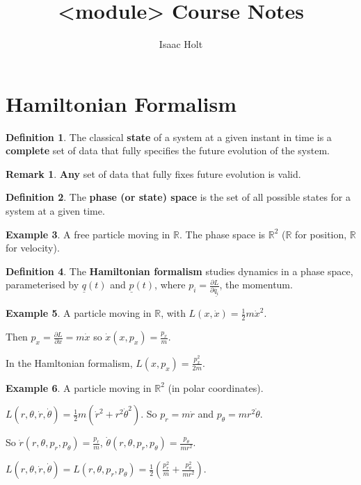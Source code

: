 \documentclass[12pt,a4paper]{article}
\title{<module> Course Notes}
\author{Isaac Holt}
\theoremstyle{definition}
\newtheorem{definition}{Definition}[subsection]
\newtheorem{example}[definition]{Example}
\newtheorem*{remark}{Remark}
\begin{document}
\section{Hamiltonian Formalism}

\begin{definition}
	The classical \textbf{state} of a system at a given instant in time is a \textbf{complete} set of data that fully specifies the future evolution of the system.
\end{definition}

\begin{remark}
	\textbf{Any} set of data that fully fixes future evolution is valid.
\end{remark}

\begin{definition}
	The \textbf{phase (or state) space} is the set of all possible states for a system at a given time.
\end{definition}

\begin{example}
	A free particle moving in $\mathbb{R}$. The phase space is $\mathbb{R}^2$ ($\mathbb{R}$ for position, $\mathbb{R}$ for velocity).
\end{example}

\begin{definition}
	The \textbf{Hamiltonian formalism} studies dynamics in a phase space, parameterised by $\underline{q}(t)$ and $\underline{p}(t)$, where $p_i = \frac{\partial L}{\partial \dot{\underline{q_i}}}$, the momentum.
\end{definition}

\begin{example}
	A particle moving in $\mathbb{R}$, with $L(x, \dot{x}) = \frac{1}{2} m \dot{x}^2$.

	Then $p_x = \frac{\partial L}{\partial \dot{x}} = m \dot{x}$ so $\dot{x}(x, p_x) = \frac{p_x}{m}$.

	In the Hamltonian formalism, $L(x, p_x) = \frac{p_x^2}{2m}$.
\end{example}

\begin{example}
	A particle moving in $\mathbb{R}^2$ (in polar coordinates).

	$L(r, \theta, \dot{r}, \dot{\theta}) = \frac{1}{2} m (\dot{r}^2 + r^2 \dot{\theta}^2)$. So $p_r = m\dot{r}$ and $p_{\theta} = m r^2 \dot{\theta}$.

	So $\dot{r}(r, \theta, p_r, p_{\theta}) = \frac{p_r}{m}$, $\dot{\theta}(r, \theta, p_r, p_{\theta}) = \frac{p_{\theta}}{m r^2}$.

	$L(r, \theta, \dot{r}, \dot{\theta}) = L(r, \theta, p_r, p_{\theta}) = \frac{1}{2} (\frac{p_r^2}{m} + \frac{p_{\theta}^2}{m r^2})$.
\end{example}
\end{document}
